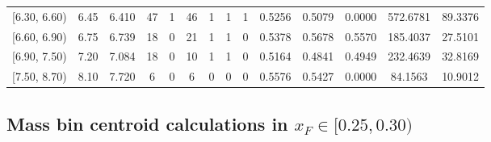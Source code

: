 \begin{table}[htbp]
{\begin{tabular}{cc|c|cccccc|ccc|cc}
        {[6.30, 6.60)} & 6.45 & 6.410 & 47 & 1 & 46 & 1 & 1 & 1 & 0.5256 & 0.5079 & 0.0000 & 572.6781 & 89.3376 \\
        {[6.60, 6.90)} & 6.75 & 6.739 & 18 & 0 & 21 & 1 & 1 & 0 & 0.5378 & 0.5678 & 0.5570 & 185.4037 & 27.5101 \\
        {[6.90, 7.50)} & 7.20 & 7.084 & 18 & 0 & 10 & 1 & 1 & 0 & 0.5164 & 0.4841 & 0.4949 & 232.4639 & 32.8169 \\
        {[7.50, 8.70)} & 8.10 & 7.720 & 6 & 0 & 6 & 0 & 0 & 0 & 0.5576 & 0.5427 & 0.0000 & 84.1563 & 10.9012 \\
        \hline\hline
    \end{tabular}
    }
\end{table}

\clearpage
\subsection{\texorpdfstring{Mass bin centroid calculations in $x_F \in [0.25, 0.30)$}{Mass bin centroid calculations in x\_F in [0.25, 0.30)]}}

